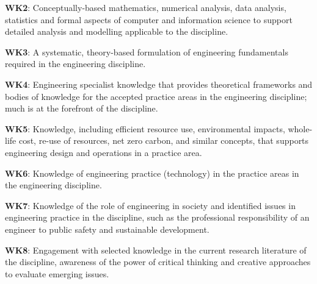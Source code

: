 \begin{titlepage}
{\textbf{WK2}: Conceptually-based mathematics, numerical analysis, data analysis, statistics and formal aspects of computer and information science to support detailed analysis and modelling applicable to the discipline.

\textbf{WK3}: A systematic, theory-based formulation of engineering fundamentals required in the engineering discipline.

\textbf{WK4}: Engineering specialist knowledge that provides theoretical frameworks and bodies of knowledge for the accepted practice areas in the engineering discipline; much is at the forefront of the discipline.

\textbf{WK5}: Knowledge, including efficient resource use, environmental impacts, whole-life cost, re-use of resources, net zero carbon, and similar concepts, that supports engineering design and operations in a practice area.

\textbf{WK6}: Knowledge of engineering practice (technology) in the practice areas in the engineering discipline.

\textbf{WK7}: Knowledge of the role of engineering in society and identified issues in engineering practice in the discipline, such as the professional responsibility of an engineer to public safety and sustainable development.

\textbf{WK8}: Engagement with selected knowledge in the current research literature of the discipline, awareness of the power of critical thinking and creative approaches to evaluate emerging issues.

}
\end{titlepage}
